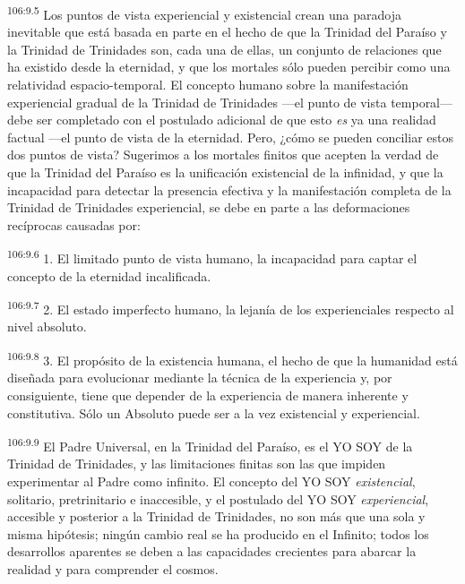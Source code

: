 \par
\textsuperscript{106:9.5} Los puntos de vista experiencial y existencial crean una paradoja inevitable que está basada en parte en el hecho de que la Trinidad del Paraíso y la Trinidad de Trinidades son, cada una de ellas, un conjunto de relaciones que ha existido desde la eternidad, y que los mortales sólo pueden percibir como una relatividad espacio-temporal. El concepto humano sobre la manifestación experiencial gradual de la Trinidad de Trinidades ---el punto de vista temporal--- debe ser completado con el postulado adicional de que esto \textit{es} ya una realidad factual ---el punto de vista de la eternidad. Pero, ¿cómo se pueden conciliar estos dos puntos de vista? Sugerimos a los mortales finitos que acepten la verdad de que la Trinidad del Paraíso es la unificación existencial de la infinidad, y que la incapacidad para detectar la presencia efectiva y la manifestación completa de la Trinidad de Trinidades experiencial, se debe en parte a las deformaciones recíprocas causadas por:

\par
\textsuperscript{106:9.6} 1. El limitado punto de vista humano, la incapacidad para captar el concepto de la eternidad incalificada.

\par
\textsuperscript{106:9.7} 2. El estado imperfecto humano, la lejanía de los experienciales respecto al nivel absoluto.

\par
\textsuperscript{106:9.8} 3. El propósito de la existencia humana, el hecho de que la humanidad está diseñada para evolucionar mediante la técnica de la experiencia y, por consiguiente, tiene que depender de la experiencia de manera inherente y constitutiva. Sólo un Absoluto puede ser a la vez existencial y experiencial.

\par
\textsuperscript{106:9.9} El Padre Universal, en la Trinidad del Paraíso, es el YO SOY de la Trinidad de Trinidades, y las limitaciones finitas son las que impiden experimentar al Padre como infinito. El concepto del YO SOY \textit{existencial}, solitario, pretrinitario e inaccesible, y el postulado del YO SOY \textit{experiencial}, accesible y posterior a la Trinidad de Trinidades, no son más que una sola y misma hipótesis; ningún cambio real se ha producido en el Infinito; todos los desarrollos aparentes se deben a las capacidades crecientes para abarcar la realidad y para comprender el cosmos.

